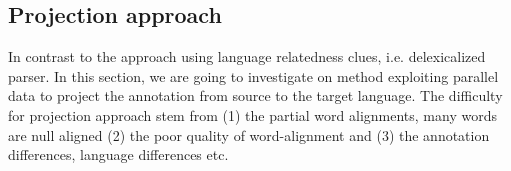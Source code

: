 




\subsection{Projection approach}
In contrast to the approach using language relatedness clues, i.e. delexicalized parser. In this section, we are going to investigate on method exploiting parallel data to project the annotation from source to the target language. The difficulty for projection approach stem from (1) the partial word alignments, many words are null aligned (2) the poor quality of word-alignment and (3) the annotation differences, language differences etc. 

